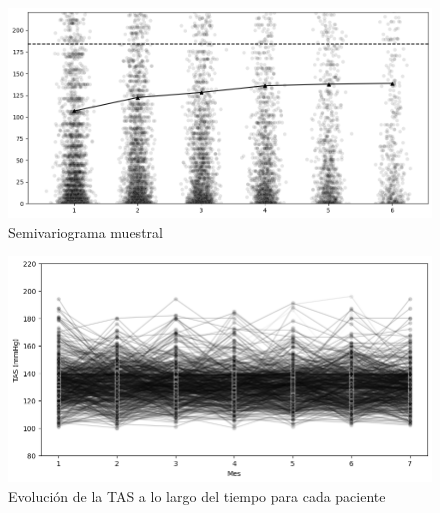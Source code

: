 \documentclass[spanish]{article}
\numberwithin{figure}{subsection}
\numberwithin{equation}{subsection}
\numberwithin{table}{subsection}
\begin{document}
\begin{figure}[H]
	\centering
	\includegraphics[scale=0.4]{img/semivariogram.png}
	\caption{Semivariograma muestral}
	\label{semivariogram}
\end{figure}

\begin{figure}[H]
	\centering
	\includegraphics[scale=0.5]{img/TAS_vs_tpo_perfiles_individuales.png}
	\caption{Evolución de la TAS a lo largo del tiempo para cada paciente}
	\label{perfiles_individuales}
\end{figure}


\newpage
\nocite{*}
\renewcommand{\refname}{Bibliografía}

\end{document}
